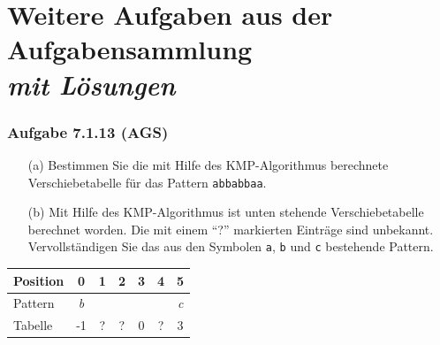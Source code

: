 \documentclass{beamer}
\begin{document}
\section{Weitere Aufgaben aus der Aufgabensammlung \\ \textit{mit Lösungen}}

\begin{frame} \frametitle{Aufgabe 7.1.13 (AGS)}
	
	\begin{itemize}
		\item[(a)] Bestimmen Sie die mit Hilfe des KMP-Algorithmus berechnete Verschiebetabelle für das Pattern \texttt{abbabbaa}.
		\item[(b)] Mit Hilfe des KMP-Algorithmus ist unten stehende Verschiebetabelle berechnet worden. Die mit einem \enquote{?} markierten Einträge sind unbekannt. Vervollständigen Sie das aus den Symbolen \texttt{a}, \texttt{b} und \texttt{c} bestehende Pattern. 
	\end{itemize}
		
	\begin{center}
		\renewcommand*{\arraystretch}{1.1} \setlength{\tabcolsep}{16pt}
		\begin{tabular}{l|cccccc}
			Position &  0 &  1 &  2 &  3 &  4 &  5 \\ \hline
			Pattern  &  \textit{b} &   &   &  &  &  \textit{c} \\ \hline
			Tabelle  & -1 &  ? & ? &  0 &  ? &  3 \\
		\end{tabular}
	\end{center}
\end{frame}
\end{document}
